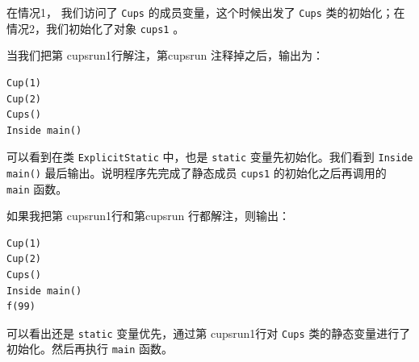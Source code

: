 \documentclass[10pt,a4paper,UTF8]{article}
\begin{document}
在情况1， 我们访问了 \texttt{Cups}  的成员变量，这个时候出发了 \texttt{Cups} 类的初始化；在情况2，我们初始化了对象 \texttt{cups1} 。

当我们把第 cupsrun1行解注，第cupsrun 注释掉之后，输出为：
\begin{verbatim}
Cup(1) 
Cup(2)
Cups()
Inside main()
\end{verbatim}

可以看到在类 \texttt{ExplicitStatic} 中，也是 \texttt{static} 变量先初始化。我们看到 \texttt{Inside main()} 最后输出。说明程序先完成了静态成员 \texttt{cups1} 的初始化之后再调用的 \texttt{main} 函数。

如果我把第 cupsrun1行和第cupsrun 行都解注，则输出：
\begin{verbatim}
Cup(1)
Cup(2)
Cups()
Inside main()
f(99)
\end{verbatim}
可以看出还是 \texttt{static} 变量优先，通过第 cupsrun1行对 \texttt{Cups} 类的静态变量进行了初始化。然后再执行 \texttt{main} 函数。
\end{document}
